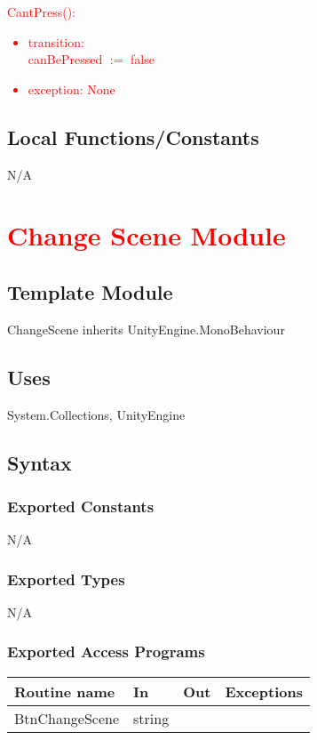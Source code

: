 \documentclass[12pt]{article}
\begin{document}
\noindent\textcolor{red}{CantPress():
\begin{itemize}
	\item transition: \\
	canBePressed $:=$ false
	\item exception: None
\end{itemize}}

\subsection{Local Functions/Constants}
N/A

\newpage
\section {\textcolor{red}{Change Scene Module}}

\subsection{Template Module}
ChangeScene inherits UnityEngine.MonoBehaviour

\subsection {Uses}
System.Collections, UnityEngine

\subsection {Syntax}

\subsubsection {Exported Constants}
N/A
\subsubsection {Exported Types}
N/A
\subsubsection {Exported Access Programs}

\begin{tabular}{| l | l | l | l |}
\hline
\textbf{Routine name} & \textbf{In} & \textbf{Out} & \textbf{Exceptions}\\
\hline
BtnChangeScene    &  string        &           &          \\
\hline
\end{tabular}
\end{document}
